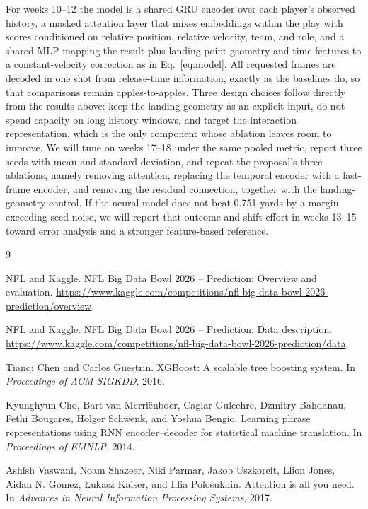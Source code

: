 \documentclass{article}
\begin{document}
For weeks 10--12 the model is a shared GRU encoder over each player's observed
history, a masked attention layer that mixes embeddings within the play with scores
conditioned on relative position, relative velocity, team, and role, and a shared MLP
mapping the result plus landing-point geometry and time features to a
constant-velocity correction as in Eq.~\eqref{eq:model}. All requested frames are
decoded in one shot from release-time information, exactly as the baselines do, so
that comparisons remain apples-to-apples. Three design choices follow directly from
the results above: keep the landing geometry as an explicit input, do not spend
capacity on long history windows, and target the interaction representation, which is
the only component whose ablation leaves room to improve. We will tune on weeks
17--18 under the same pooled metric, report three seeds with mean and standard
deviation, and repeat the proposal's three ablations, namely removing attention,
replacing the temporal encoder with a last-frame encoder, and removing the residual
connection, together with the landing-geometry control. If the neural model does not
beat 0.751 yards by a margin exceeding seed noise, we will report that outcome and
shift effort in weeks 13--15 toward error analysis and a stronger feature-based
reference.

\begin{thebibliography}{9}

NFL and Kaggle.
\newblock NFL Big Data Bowl 2026 -- Prediction: Overview and evaluation.
\newblock \url{https://www.kaggle.com/competitions/nfl-big-data-bowl-2026-prediction/overview}.

NFL and Kaggle.
\newblock NFL Big Data Bowl 2026 -- Prediction: Data description.
\newblock \url{https://www.kaggle.com/competitions/nfl-big-data-bowl-2026-prediction/data}.

Tianqi Chen and Carlos Guestrin.
\newblock XGBoost: A scalable tree boosting system.
\newblock In \emph{Proceedings of ACM SIGKDD}, 2016.

Kyunghyun Cho, Bart van Merri\"enboer, Caglar Gulcehre, Dzmitry Bahdanau,
Fethi Bougares, Holger Schwenk, and Yoshua Bengio.
\newblock Learning phrase representations using RNN encoder--decoder for statistical machine translation.
\newblock In \emph{Proceedings of EMNLP}, 2014.

Ashish Vaswani, Noam Shazeer, Niki Parmar, Jakob Uszkoreit, Llion Jones,
Aidan N. Gomez, \L{}ukasz Kaiser, and Illia Polosukhin.
\newblock Attention is all you need.
\newblock In \emph{Advances in Neural Information Processing Systems}, 2017.

\end{thebibliography}
\end{document}
